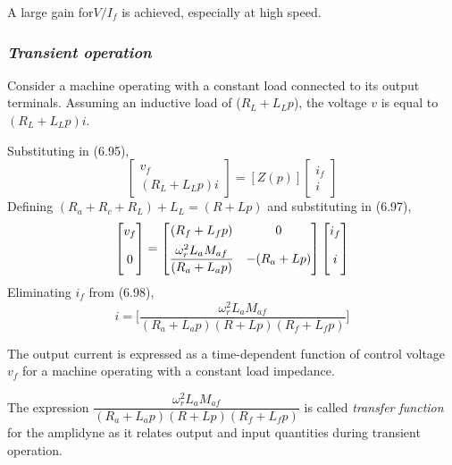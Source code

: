 \documentclass[a4paper,numbers=noenddot,12pt]{scrbook}
\begin{document}
    A large gain for$V/I_f$ is achieved, especially at high speed.

    \subsubsection{\textit{Transient operation}}
    Consider a machine operating with a constant load connected to its output terminals. Assuming an inductive load of ($R_L + L_L p$), the voltage $v$ is equal to $(R_L + L_L p)i$.

    Substituting in (6.95),
    \begin{equation}
        \begin{bmatrix}
            v_f \\ (R_L + L_L p)i
        \end{bmatrix}
        =
        [Z(p)]
        \begin{bmatrix}
            i_f \\ i
        \end{bmatrix}
        \label{eq:Eq6.97}
    \end{equation}
    Defining $(R_a + R_c + R_L) + L_L = (R + Lp)$ and substituting in (6.97),
    \begin{equation}
        \begin{bmatrix}
            v_f \\[1ex] 0 \vphantom{\dfrac{M^2}{R_a}}
        \end{bmatrix}
        =
        \begin{bmatrix}
            (R_f + L_f p) & 0 \\[1ex]
            \dfrac{\omega_r^2 L_a M_{af}}{(R_a + L_a p)} & -(R_a + Lp)
        \end{bmatrix}
        \begin{bmatrix}
            i_f \\[1ex] i\vphantom{\dfrac{M^2}{R_a}}
        \end{bmatrix}
        \label{eq:Eq6.98}
    \end{equation}
    Eliminating $i_f$ from (6.98),
    \begin{equation}
        i = \bigg[ \dfrac{\omega_r^2 L_a M_{af}}{(R_a + L_a p)(R + Lp)(R_f + L_f p)}\bigg] 
        \label{eq:Eq6.99}
    \end{equation}

    The output current is expressed as a time-dependent function of control voltage $v_f$ for a machine operating with a constant load impedance.

    The expression $\dfrac{\omega_r^2 L_a M_{af}}{(R_a + L_a p)(R + L p)(R_f + L_f p)}$ is called \textit{transfer function} for the amplidyne as it relates output and input quantities during transient operation.
\end{document}
